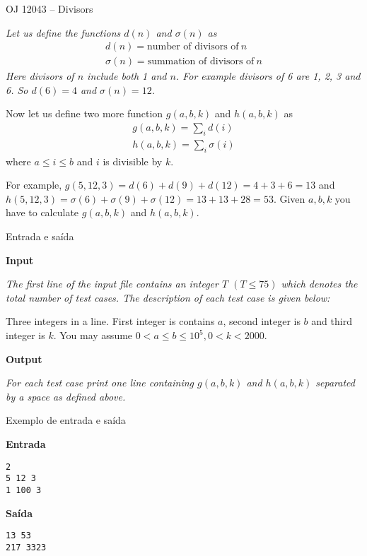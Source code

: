 \begin{frame}[fragile]{OJ 12043 -- Divisors}

{\it
Let us define the functions $d(n)$ and $\sigma(n)$ as
\[
\begin{array}{l}
d(n) = \mbox{number of divisors of}\ n \\
\sigma(n) = \mbox{summation of divisors of}\ n
\end{array}
\]
Here divisors of $n$ include both 1 and $n$. For example divisors of 6 are 1, 2, 3 and 6. So $d(6) = 4$
and $\sigma(n) = 12$.

Now let us define two more function $g(a, b, k)$ and $h(a, b, k)$ as
\[
\begin{array}{l}
g(a, b, k) = \sum_i d(i) \\
h(a, b, k) = \sum_i \sigma(i)
\end{array}
\]
where $a \leq i \leq b$ and $i$ is divisible by $k$.

For example, $g(5, 12, 3) = d(6)+d(9)+d(12) = 4+3+6 = 13$ and $h(5, 12, 3) = \sigma(6)+\sigma(9)+\sigma(12) =
13 + 13 + 28 = 53$. Given $a, b, k$ you have to calculate $g(a, b, k)$ and $h(a, b, k)$.
}
\end{frame}

\begin{frame}[fragile]{Entrada e saída}

\textbf{Input}

{\it 
The first line of the input file contains an integer $T$ $(T \leq 75)$ which denotes the total number of test
cases. The description of each test case is given below:

Three integers in a line. First integer is contains $a$, second integer is $b$ and third integer is $k$. You
may assume $0 < a \leq b \leq 10^5, 0 < k < 2000$.
}

\vspace{0.3in}


\textbf{Output}

{\it For each test case print one line containing $g(a, b, k)$ and $h(a, b, k)$ separated by a space as defined
above.}

\end{frame}

\begin{frame}[fragile]{Exemplo de entrada e saída}

\begin{minipage}[t]{0.45\textwidth}
\textbf{Entrada}
\begin{verbatim}
2
5 12 3
1 100 3
\end{verbatim}
\end{minipage}
\begin{minipage}[t]{0.5\textwidth}
\textbf{Saída}
\begin{verbatim}
13 53
217 3323
\end{verbatim}
\end{minipage}

\end{frame}


